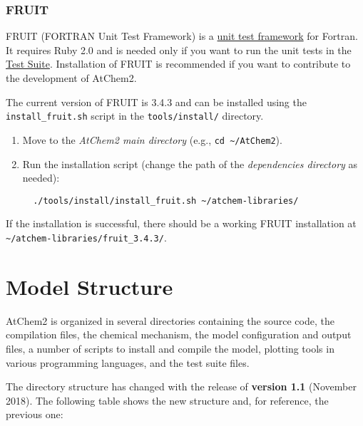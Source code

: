 \subsubsection{FRUIT} \label{fruit}

FRUIT (FORTRAN Unit Test Framework) is a
\href{https://en.wikipedia.org/wiki/Unit_testing}{unit test framework}
for Fortran. It requires Ruby 2.0 and is needed only if you want to
run the unit tests in the \hyperref[sec:testsuite]{Test Suite}.
Installation of FRUIT is recommended if you want to contribute to the
development of AtChem2.

The current version of FRUIT is 3.4.3 and can be installed using the
\texttt{install\_fruit.sh} script in the \texttt{tools/install/}
directory.

\begin{enumerate}
\item Move to the \emph{AtChem2 main directory} (e.g., \texttt{cd\
    \textasciitilde{}/AtChem2}).
\item Run the installation script (change the path of the
  \emph{dependencies directory} as needed):
\begin{verbatim}
  ./tools/install/install_fruit.sh ~/atchem-libraries/
\end{verbatim}
\end{enumerate}

If the installation is successful, there should be a working FRUIT
installation at
\texttt{\textasciitilde{}/atchem-libraries/fruit\_3.4.3/}.

\section{Model Structure} \label{sec:structure}

AtChem2 is organized in several directories containing the source
code, the compilation files, the chemical mechanism, the model
configuration and output files, a number of scripts to install and
compile the model, plotting tools in various programming languages,
and the test suite files.

The directory structure has changed with the release of
\textbf{version 1.1} (November 2018). The following table shows the
new structure and, for reference, the previous one:

